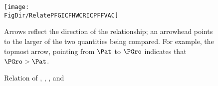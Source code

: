 \begin{figure}[h]
  \centerline{
    \texttt{[image: \\FigDir/RelatePFGICFHWCRICPFFVAC]}
  }
  \caption{Relation of \PFGIC, \FHWC, \RIC, and \PFFVAC} \label{fig:RelatePFGICFHWCRICPFFVAC}
  \footnotesize{Arrows reflect the direction of the relationship; an arrowhead points to the larger of the two quantities being compared.  For example, the topmost arrow, pointing from $\Pat$ to $\PGro$ indicates that $\PGro > \Pat$.}
\end{figure}
